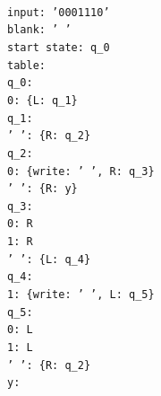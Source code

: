\documentclass[a4paper]{article}
\begin{document}
\begin{changemargin}{1.77 cm}{0 cm}
\texttt
{
\\
input: '0001110' \\
blank: ' ' \\
start state: q\_0 \\
table: \\
  q\_0: \\
    0: \{L: q\_1\} \\
  q\_1: \\
    ' ': \{R: q\_2\} \\
  q\_2: \\
    0: \{write: ' ', R: q\_3\} \\
    ' ': \{R: y\} \\
  q\_3: \\
    0: R \\
    1: R \\
    ' ': \{L: q\_4\} \\
  q\_4: \\
    1: \{write: ' ', L: q\_5\} \\
  q\_5: \\
    0: L \\
    1: L \\
    ' ': \{R: q\_2\} \\
  y: \\
}
\end{changemargin}
\newpage
\end{document}
